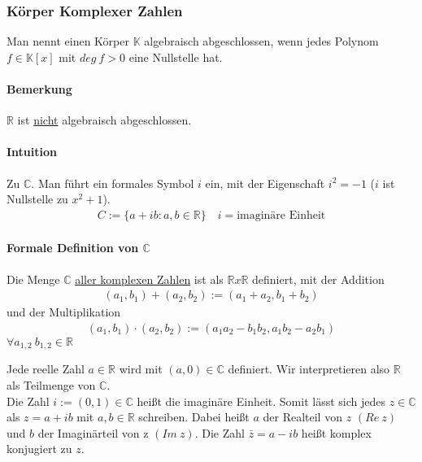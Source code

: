 \subsubsection{Körper Komplexer Zahlen}
Man nennt einen Körper $ \mathbb{K} $ algebraisch abgeschlossen, wenn jedes Polynom $ f \in \mathbb{K}[x] $ mit $ deg~f > 0 $ eine Nullstelle hat.

\paragraph{Bemerkung}
$ \mathbb{R} $ ist \underline{nicht} algebraisch abgeschlossen.

\paragraph{Intuition}
Zu $ \mathbb{C} $. Man führt ein formales Symbol $ i $ ein, mit der Eigenschaft $ i^2 = -1 $ ($ i $ ist Nullstelle zu $ x^2+1 $).
\begin{eqnarray*}
	C := \{ a+ib : a,b \in \mathbb{R} \} \quad i = \text{imaginäre Einheit}
\end{eqnarray*}

\paragraph{Formale Definition von $ \mathbb{C} $}
Die Menge $ \mathbb{C} $ \underline{aller komplexen Zahlen} ist als $ \mathbb{R} x \mathbb{R} $ definiert, mit der Addition 
\begin{eqnarray*}
	(a_{1},b_{1})+(a_{2},b_{2}) := (a_{1} + a_{2}, b_{1} + b_{2} )
\end{eqnarray*} 
und der Multiplikation
\begin{eqnarray*}
	(a_{1},b_{1})\cdot (a_{2},b_{2}) := (a_{1} a_{2} - b_{1} b_{2}, a_{1} b_{2} - a_{2} b_{1})
\end{eqnarray*}
$ \forall a_{1,2} ~ b_{1,2} \in \mathbb{R} $

Jede reelle Zahl $ a \in \mathbb{R} $ wird mit $ (a,0) \in \mathbb{C} $ definiert. Wir interpretieren also $ \mathbb{R} $ als Teilmenge von $ \mathbb{C} $.
\\

Die Zahl $ i := (0,1) \in \mathbb{C} $ heißt die imaginäre Einheit. Somit lässt sich jedes $ z \in \mathbb{C} $ als $ z = a+ib $ mit $ a,b \in \mathbb{R} $ schreiben. Dabei heißt $ a $ der Realteil von $ z $ $ (Re~z) $ und $ b $ der Imaginärteil von z $ (Im~z) $. Die Zahl $ \bar{z} = a -ib $ heißt komplex konjugiert zu $ z $.

